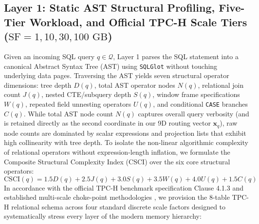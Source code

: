 \documentclass[10pt,a4paper]{article}
\begin{document}
\subsection{Layer 1: Static AST Structural Profiling, Five-Tier Workload, and Official TPC-H Scale Tiers ($\text{SF}=1, 10, 30, 100\text{ GB}$)}
Given an incoming SQL query $q \in \mathcal{Q}$, Layer 1 parses the SQL statement into a canonical Abstract Syntax Tree (AST) using \texttt{SQLGlot} \cite{mao2024sqlglot} without touching underlying data pages. Traversing the AST yields seven structural operator dimensions: tree depth $D(q)$, total AST operator nodes $N(q)$, relational join count $J(q)$, nested CTE/subquery depth $S(q)$, window frame specifications $W(q)$, repeated field unnesting operators $U(q)$, and conditional \texttt{CASE} branches $C(q)$. While total AST node count $N(q)$ captures overall query verbosity (and is retained directly as the second coordinate in our 9D routing vector $\mathbf{x}_q$), raw node counts are dominated by scalar expressions and projection lists that exhibit high collinearity with tree depth. To isolate the non-linear algorithmic complexity of relational operators without expression-length inflation, we formulate the Composite Structural Complexity Index ($\text{CSCI}$) over the six core structural operators:
\begin{equation}
    \text{CSCI}(q) = 1.5 D(q) + 2.5 J(q) + 3.0 S(q) + 3.5 W(q) + 4.0 U(q) + 1.5 C(q)
\end{equation}
In accordance with the official TPC-H benchmark specification Clause 4.1.3 \cite{tpc2022tpch} and established multi-scale choke-point methodologies \cite{boncz2014tpch,dreseler2020quantifying,kuiper2024duckdb_ooc}, we provision the 8-table TPC-H relational schema across four standard discrete scale factors designed to systematically stress every layer of the modern memory hierarchy:
\end{document}
